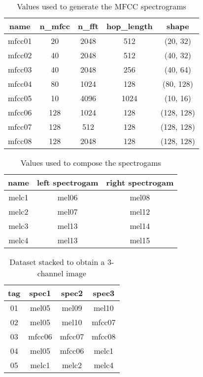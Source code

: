 \begin{table}[h!]
    \centering
    \caption{Values used to generate the MFCC spectrograms}
    \label{tab:mfcc_values}
    \begin{tabular}{|c|cccc|}
        \hline
        name & n\_mfcc & n\_fft & hop\_length & shape \\
        \hline
        mfcc01 & 20  & 2048 & 512  & (20, 32) \\
        mfcc02 & 40  & 2048 & 512  & (40, 32) \\
        mfcc03 & 40  & 2048 & 256  & (40, 64) \\
        mfcc04 & 80  & 1024 & 128  & (80, 128) \\
        mfcc05 & 10  & 4096 & 1024 & (10, 16) \\
        mfcc06 & 128 & 1024 & 128  & (128, 128) \\
        mfcc07 & 128 & 512  & 128  & (128, 128) \\
        mfcc08 & 128 & 2048 & 128  & (128, 128) \\
        \hline
    \end{tabular}
\end{table}

\begin{table}[h!]
    \centering
    \caption{Values used to compose the spectrogams}
    \label{tab:compose_values}
    \begin{tabular}{|c|cc|}
        \hline
        name & left spectrogam & right spectrogam \\
        \hline
        melc1 & mel06 & mel08 \\
        melc2 & mel07 & mel12 \\
        melc3 & mel13 & mel14 \\
        melc4 & mel13 & mel15 \\
        \hline
    \end{tabular}
\end{table}

\begin{table}[h!]
    \centering
    \caption{Dataset stacked to obtain a 3-channel image}
    \label{tab:ch3_values}
    \begin{tabular}{|c|ccc|}
        \hline
        tag & spec1 & spec2 & spec3 \\
        \hline
        01 & mel05  & mel09  & mel10 \\
        02 & mel05  & mel10  & mfcc07 \\
        03 & mfcc06 & mfcc07 & mfcc08 \\
        04 & mel05  & mfcc06 & melc1 \\
        05 & melc1  & melc2  & melc4 \\
        \hline
    \end{tabular}
\end{table}

